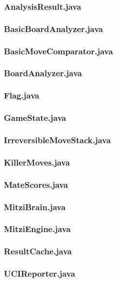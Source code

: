 \documentclass [12pt ,a4paper, english]{scrartcl}
\theoremstyle{plain}
\theoremstyle{definition}
\theoremstyle{remark}
\begin{document}
\subsubsection*{AnalysisResult.java}


\subsubsection*{BasicBoardAnalyzer.java}


\subsubsection*{BasicMoveComparator.java}


\subsubsection*{BoardAnalyzer.java}


\subsubsection*{Flag.java}


\subsubsection*{GameState.java}


\subsubsection*{IrreversibleMoveStack.java}


\subsubsection*{KillerMoves.java}


\subsubsection*{MateScores.java}


\subsubsection*{MitziBrain.java}
\label{sec:mitzibrain}


\subsubsection*{MitziEngine.java}


\subsubsection*{ResultCache.java}


\subsubsection*{UCIReporter.java}

\end{document}
